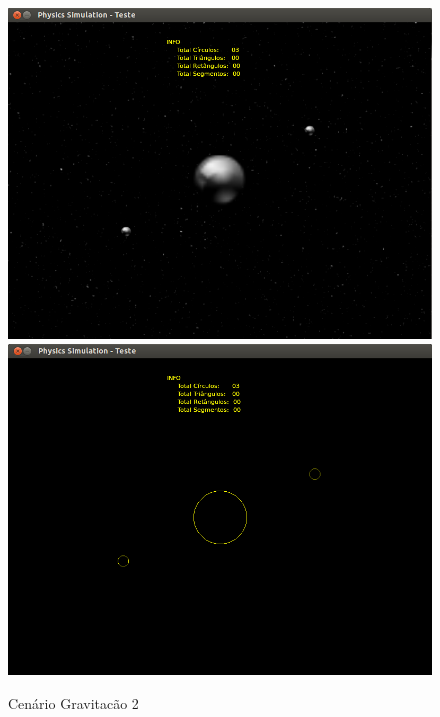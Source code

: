   \begin{figure}[H]
	\centering
	\caption{Cenário Gravitacão 2}
    \includegraphics[scale=0.4]{images/cenario-gravitacao-4.png}
    \includegraphics[scale=0.4]{images/cenario-gravitacao-3.png}
  \end{figure}

